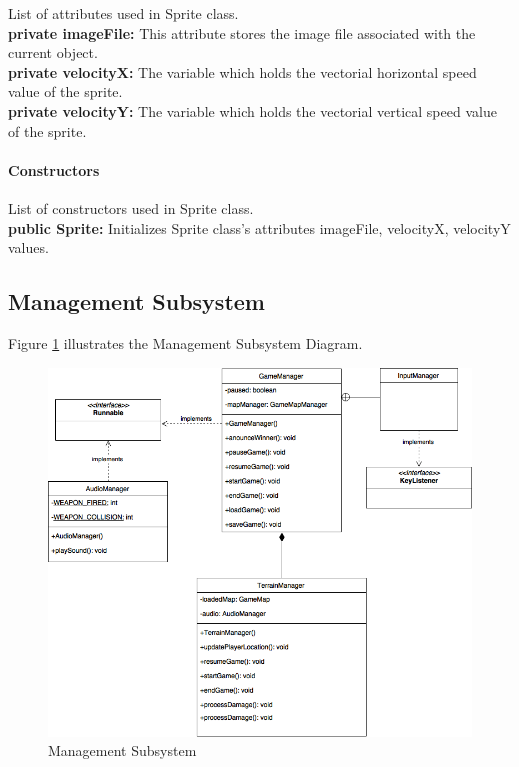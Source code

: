 \documentclass[12pt]{article} %
\begin{document}
List of attributes used in Sprite class.\\
\textbf{private imageFile:} This attribute stores the image file associated with the current object.\\
\textbf{private velocityX:} The variable which holds the vectorial horizontal speed value of the sprite.\\
\textbf{private velocityY:} The variable which holds the vectorial vertical speed value of the sprite.\\
\paragraph{Constructors \\}
List of constructors used in Sprite class.\\
\textbf{public Sprite:} Initializes Sprite class's attributes imageFile, velocityX, velocityY values.




\subsection{Management Subsystem}

Figure \ref{fig:controller} illustrates the Management Subsystem Diagram.

\begin{figure}[h!]
   \centering
   \vspace{10pt}%
   \includegraphics[width=17cm]{controller.png}
   \caption{Management Subsystem}
   \label{fig:controller}
\end{figure}
\end{document}
